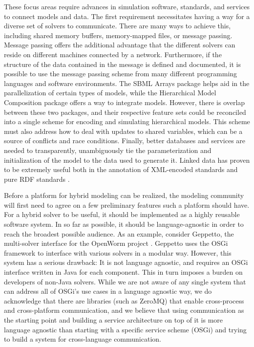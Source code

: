 \documentclass[journal,transmag,twoside]{IEEEtran}
\begin{document}
These focus areas require advances in simulation software, standards, and services to connect models and data. The first requirement necessitates having a way for a diverse set of solvers to communicate. There are many ways to achieve this, including shared memory buffers, memory-mapped files, or message passing. Message passing offers the additional advantage that the different solvers can reside on different machines connected by a network. Furthermore, if the structure of the data contained in the message is defined and documented, it is possible to use the message passing scheme from many different programming languages and software environments. The SBML Arrays package \cite{watanabe2016efficient} helps aid in the parallelization of certain types of models, while the Hierarchical Model Composition package \cite{smith2015sbml} offers a way to integrate models. However, there is overlap between these two packages, and their respective feature sets could be reconciled into a single scheme for encoding and simulating hierarchical models. This scheme must also address how to deal with updates to shared variables, which can be a source of conflicts and race conditions. Finally, better databases and services are needed to transparently, unambiguously tie the parameterization and initialization of the model to the data used to generate it. Linked data has proven to be extremely useful both in the annotation of XML-encoded standards \cite{novere2005minimum} and pure RDF standards \cite{galdzicki2014synthetic}.

Before a platform for hybrid modeling can be realized, the modeling community will first need to agree on a few preliminary features such a platform should have. For a hybrid solver to be useful, it should be implemented as a highly reusable software system. In so far as possible, it should be language-agnostic in order to reach the broadest possible audience. As an example, consider Geppetto, the multi-solver interface for the OpenWorm project \cite{szigeti2014openworm}. Geppetto uses the OSGi framework to interface with various solvers in a modular way. However, this system has a serious drawback: It is not language agnostic, and requires an OSGi interface written in Java for each component. This in turn imposes a burden on developers of non-Java solvers. While we are not aware of any single system that can address all of OSGi's use cases in a language agnostic way, we do acknowledge that there are libraries (such as ZeroMQ) that enable cross-process and cross-platform communication, and we believe that using communication as the starting point and building a service architecture on top of it is more language agnostic than starting with a specific service scheme (OSGi) and trying to build a system for cross-language communication.
\end{document}
